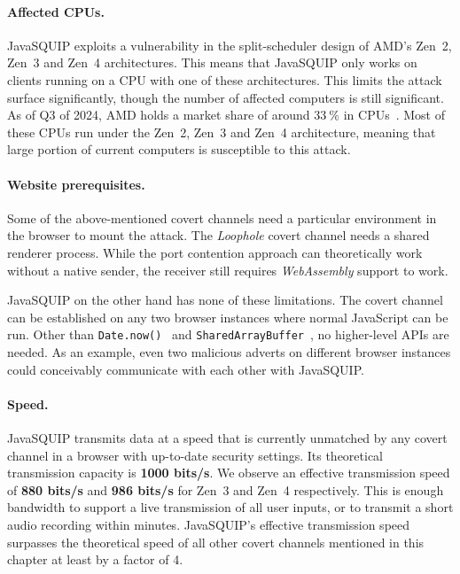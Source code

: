 \documentclass[11pt,
  titlepage=false,
  parskip=half,      %
]{scrreprt}
\begin{document}
\paragraph{Affected CPUs.}
JavaSQUIP exploits a vulnerability in the split-scheduler design of AMD's Zen~2, Zen~3 and Zen~4 architectures.
This means that JavaSQUIP only works on clients running on a CPU with one of these architectures.
This limits the attack surface significantly, though the number of affected computers is still significant.
As of Q3 of 2024, AMD holds a market share of around $33~\%$ in CPUs~\cite{amdmarket}.
Most of these CPUs run under the Zen~2, Zen~3 and Zen~4 architecture,
meaning that large portion of current computers is susceptible to this attack.

\paragraph{Website prerequisites.}
Some of the above-mentioned covert channels need a particular environment in the browser to mount the attack.
The \textit{Loophole} covert channel needs a shared renderer process.
While the port contention approach can theoretically work without a native sender,
the receiver still requires \textit{WebAssembly} support to work.

JavaSQUIP on the other hand has none of these limitations.
The covert channel can be established on any two browser instances where normal JavaScript can be run.
Other than \texttt{Date.now()}~\cite{datenow} and \texttt{SharedArrayBuffer}~\cite{sharedarraybuffer},
no higher-level APIs are needed.
As an example, even two malicious adverts on different browser instances could conceivably communicate with each other
with JavaSQUIP.

\paragraph{Speed.}
JavaSQUIP transmits data at a speed that is currently unmatched by any covert channel in a browser with up-to-date security settings.
Its theoretical transmission capacity is \textbf{1000 bits/s}.
We observe an effective transmission speed of \textbf{880 bits/s} and \textbf{986 bits/s} for Zen~3 and Zen~4 respectively.
This is enough bandwidth to support a live transmission of all user inputs, or to transmit a short audio recording within minutes.
JavaSQUIP's effective transmission speed surpasses the theoretical speed of all other covert channels mentioned in this chapter at least by a factor of 4.
\end{document}
